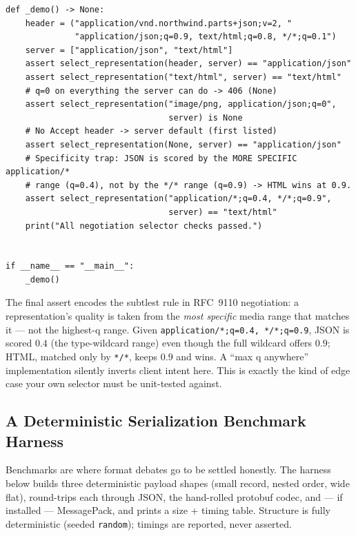 \begin{verbatim}
def _demo() -> None:
    header = ("application/vnd.northwind.parts+json;v=2, "
              "application/json;q=0.9, text/html;q=0.8, */*;q=0.1")
    server = ["application/json", "text/html"]
    assert select_representation(header, server) == "application/json"
    assert select_representation("text/html", server) == "text/html"
    # q=0 on everything the server can do -> 406 (None)
    assert select_representation("image/png, application/json;q=0",
                                 server) is None
    # No Accept header -> server default (first listed)
    assert select_representation(None, server) == "application/json"
    # Specificity trap: JSON is scored by the MORE SPECIFIC application/*
    # range (q=0.4), not by the */* range (q=0.9) -> HTML wins at 0.9.
    assert select_representation("application/*;q=0.4, */*;q=0.9",
                                 server) == "text/html"
    print("All negotiation selector checks passed.")


if __name__ == "__main__":
    _demo()
\end{verbatim}

\begin{warningbox}
The final assert encodes the subtlest rule in RFC~9110 negotiation: a
representation's quality is taken from the \emph{most specific} media range that
matches it --- not the highest-q range. Given \texttt{application/*;q=0.4,
*/*;q=0.9}, JSON is scored $0.4$ (the type-wildcard range) even though the full
wildcard offers $0.9$; HTML, matched only by \texttt{*/*}, keeps $0.9$ and wins.
A ``max q anywhere'' implementation silently inverts client intent here. This is
exactly the kind of edge case your own selector must be unit-tested against.
\end{warningbox}

\subsection{A Deterministic Serialization Benchmark Harness}
\label{sec:ch4-code-bench}

Benchmarks are where format debates go to be settled honestly. The harness below
builds three deterministic payload shapes (small record, nested order, wide flat),
round-trips each through JSON, the hand-rolled protobuf codec, and --- if installed
--- MessagePack, and prints a size + timing table. Structure is fully deterministic
(seeded \texttt{random}); timings are reported, never asserted.

